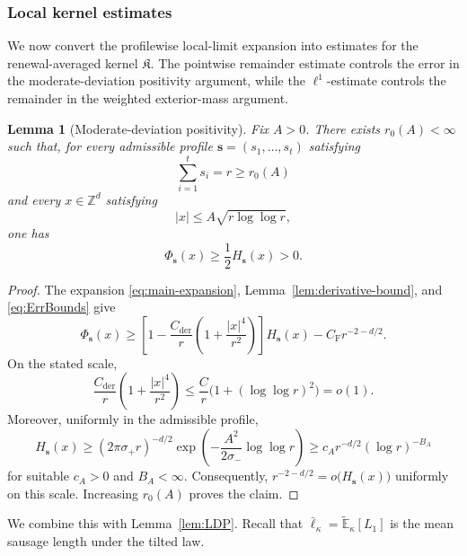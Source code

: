 \documentclass[letterpaper,11pt,reqno]{amsart}
\newtheorem{lemma}[thm]{Lemma}
\theoremstyle{definition}
\newcommand{\IK}{\mathfrak{K}}
\begin{document}
\smallskip
\subsubsection*{Local kernel estimates}

We now convert the profilewise local-limit expansion into estimates for the renewal-averaged
kernel \(\IK\). The pointwise remainder estimate controls the error in the moderate-deviation
positivity argument, while the \(\ell^1\)-estimate controls the remainder in the weighted
exterior-mass argument.

\begin{lemma}[Moderate-deviation positivity]\label{lem:Phi-positive-moddev}
Fix \(A>0\). There exists \(r_0(A)<\infty\) such that, for every admissible profile
\(\mathbf s=(s_1,\ldots,s_t)\) satisfying
\[
\sum_{i=1}^t s_i=r\ge r_0(A)
\]
and every \(x\in\mathbb Z^d\) satisfying
\[
|x|\le A\sqrt{r\log\log r},
\]
one has
\[
\Phi_{\mathbf s}(x)\ge \frac12 H_{\mathbf s}(x)>0.
\]
\end{lemma}

\begin{proof}
The expansion \eqref{eq:main-expansion}, Lemma~\ref{lem:derivative-bound}, and
\eqref{eq:ErrBounds} give
\[
\Phi_{\mathbf s}(x)
\ge
\left[
1-\frac{C_{\mathrm{der}}}{r}
\left(1+\frac{|x|^4}{r^2}\right)
\right]H_{\mathbf s}(x)
-C_{\mathrm F}r^{-2-d/2}.
\]
On the stated scale,
\[
\frac{C_{\mathrm{der}}}{r}
\left(1+\frac{|x|^4}{r^2}\right)
\le
\frac{C}{r}\bigl(1+(\log\log r)^2\bigr)=o(1).
\]
Moreover, uniformly in the admissible profile,
\[
H_{\mathbf s}(x)
\ge
(2\pi\sigma_+r)^{-d/2}
\exp\!\left(-\frac{A^2}{2\sigma_-}\log\log r\right)
\ge
c_A r^{-d/2}(\log r)^{-B_A}
\]
for suitable \(c_A>0\) and \(B_A<\infty\). Consequently,
$r^{-2-d/2}=o\bigl(H_{\mathbf s}(x)\bigr)$
uniformly on this scale. Increasing \(r_0(A)\) proves the claim.
\end{proof}

We combine this with 
Lemma~\ref{lem:LDP}. Recall that
\(\bar\ell_\kappa=\tilde{\mathbb E}_\kappa[L_1]\) is the mean sausage length under the tilted
law.
\end{document}
